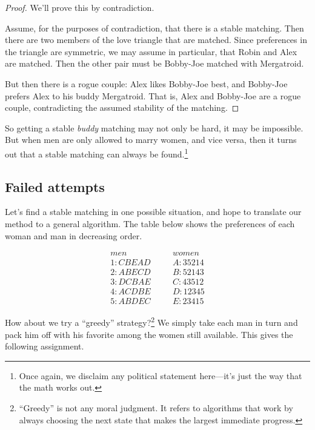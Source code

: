 \begin{proof}
We'll prove this by contradiction.

Assume, for the purposes of contradiction, that there is a stable
matching.  Then there are two members of the love triangle that are
matched.  Since preferences in the triangle are symmetric, we may assume
in particular, that Robin and Alex are matched.  Then the other pair must
be Bobby-Joe matched with Mergatroid.

But then there is a rogue couple: Alex likes Bobby-Joe best, and Bobby-Joe
prefers Alex to his buddy Mergatroid.  That is, Alex and Bobby-Joe are a
rogue couple, contradicting the assumed stability of the matching.
\end{proof}

So getting a stable \emph{buddy} matching may not only be hard, it may
be impossible.  But when men are only allowed to marry women, and
vice versa, then it turns out that a stable matching can always be
found.\footnote{Once again, we disclaim any political statement
  here---it's just the way that the math works out.}


\iffalse

\subsection{Failed attempts}

Let's find a stable matching in one possible situation, and hope to
translate our method to a general algorithm.  The table below shows the
preferences of each woman and man in decreasing order.

\begin{eqnarray*}
men & \quad & women \\
1 : C B E A D & \quad & A : 3 5 2 1 4 \\
2 : A B E C D & \quad & B : 5 2 1 4 3 \\
3 : D C B A E & \quad & C : 4 3 5 1 2 \\
4 : A C D B E & \quad & D : 1 2 3 4 5 \\
5 : A B D E C & \quad & E : 2 3 4 1 5
\end{eqnarray*}

How about we try a ``greedy'' strategy?\footnote{``Greedy'' is not any
moral judgment.  It refers to algorithms that work by always choosing the
next state that makes the largest immediate progress.}  We simply take
each man in turn and pack him off with his favorite among the women still
available.  This gives the following assignment.

